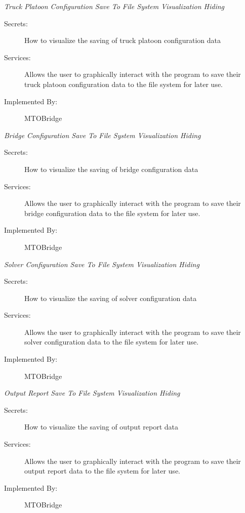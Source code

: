 \documentclass[12pt, titlepage]{article}
\begin{document}
     \hypertarget{TPCSTFSVH}{\emph{{\large Truck Platoon Configuration Save To File System Visualization Hiding}}}
    \begin{description}
        \item[Secrets:]How to visualize the saving of truck platoon configuration data
        \item[Services:]Allows the user to graphically interact with the program to save their truck platoon configuration data to the file system for later use.
        \item[Implemented By:] MTOBridge\\
    \end{description}
    \hypertarget{BCSTFSVH}{ \emph{{\large Bridge Configuration Save To File System Visualization Hiding}}}
    \begin{description}
        \item[Secrets:]How to visualize the saving of bridge configuration data
        \item[Services:]Allows the user to graphically interact with the program to save their bridge configuration data to the file system for later use.
        \item[Implemented By:] MTOBridge\\
    \end{description}
     \hypertarget{SCSTFSVH}{\emph{{\large Solver Configuration Save To File System Visualization Hiding}}}
    \begin{description}
        \item[Secrets:]How to visualize the saving of solver configuration data
        \item[Services:]Allows the user to graphically interact with the program to save their solver configuration data to the file system for later use.
        \item[Implemented By:] MTOBridge\\
    \end{description}
     \hypertarget{ORSTFSVH}{\emph{{\large Output Report Save To File System Visualization Hiding}}}
    \begin{description}
        \item[Secrets:]How to visualize the saving of output report data
        \item[Services:]Allows the user to graphically interact with the program to save their output report data to the file system for later use.
        \item[Implemented By:] MTOBridge\\
    \end{description}
\end{document}
